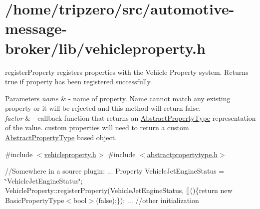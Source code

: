 \hypertarget{_2home_2tripzero_2src_2automotive-message-broker_2lib_2vehicleproperty_8h-example}{\section{/home/tripzero/src/automotive-\/message-\/broker/lib/vehicleproperty.\-h}
}
register\-Property registers properties with the Vehicle Property system. Returns true if property has been registered successfully. 
\begin{DoxyParams}{Parameters}
{\em name} & -\/ name of property. Name cannot match any existing property or it will be rejected and this method will return false. \\
\hline
{\em factor} & -\/ callback function that returns an \hyperlink{classAbstractPropertyType}{Abstract\-Property\-Type} representation of the value. custom properties will need to return a custom \hyperlink{classAbstractPropertyType}{Abstract\-Property\-Type} based object.\\
\hline
\end{DoxyParams}
\#include $<$\hyperlink{vehicleproperty_8h_source}{vehicleproperty.\-h}$>$ \#include $<$\hyperlink{abstractpropertytype_8h_source}{abstractpropertytype.\-h}$>$

//\-Somewhere in a source plugin\-: ... Property Vehicle\-Jet\-Engine\-Status = \char`\"{}\-Vehicle\-Jet\-Engine\-Status\char`\"{}; Vehicle\-Property\-::register\-Property(Vehicle\-Jet\-Engine\-Status, \mbox{[}\mbox{]}()\{return new Basic\-Property\-Type$<$bool$>$(false);\}); ... //other initialization


\begin{DoxyCodeInclude}
\end{DoxyCodeInclude}
 